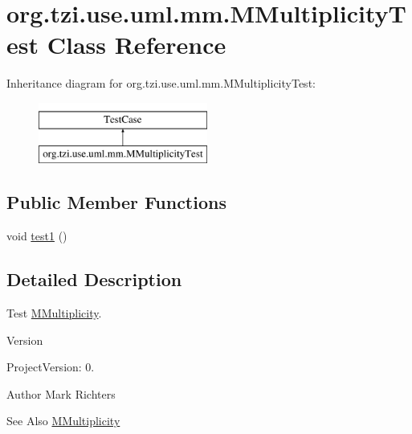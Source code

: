 \hypertarget{classorg_1_1tzi_1_1use_1_1uml_1_1mm_1_1_m_multiplicity_test}{\section{org.\-tzi.\-use.\-uml.\-mm.\-M\-Multiplicity\-Test Class Reference}
\label{classorg_1_1tzi_1_1use_1_1uml_1_1mm_1_1_m_multiplicity_test}
}
Inheritance diagram for org.\-tzi.\-use.\-uml.\-mm.\-M\-Multiplicity\-Test\-:\begin{figure}[H]
\begin{center}
\leavevmode
\includegraphics[height=2.000000cm]{classorg_1_1tzi_1_1use_1_1uml_1_1mm_1_1_m_multiplicity_test}
\end{center}
\end{figure}
\subsection*{Public Member Functions}
\begin{DoxyCompactItemize}
\item 
void \hyperlink{classorg_1_1tzi_1_1use_1_1uml_1_1mm_1_1_m_multiplicity_test_a514ac2446c9b3daa86d7a149a3364c99}{test1} ()
\end{DoxyCompactItemize}


\subsection{Detailed Description}
Test \hyperlink{classorg_1_1tzi_1_1use_1_1uml_1_1mm_1_1_m_multiplicity}{M\-Multiplicity}.

\begin{DoxyVersion}{Version}

\end{DoxyVersion}
\begin{DoxyParagraph}{Project\-Version\-:}
0. 
\end{DoxyParagraph}
\begin{DoxyAuthor}{Author}
Mark Richters 
\end{DoxyAuthor}
\begin{DoxySeeAlso}{See Also}
\hyperlink{classorg_1_1tzi_1_1use_1_1uml_1_1mm_1_1_m_multiplicity}{M\-Multiplicity} 
\end{DoxySeeAlso}


